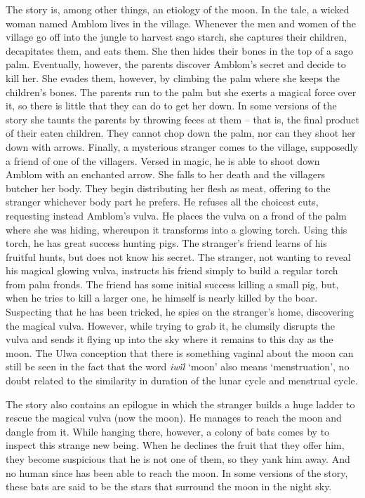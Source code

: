   The story is, among other things, an etiology of the moon. In the tale, a wicked woman named Amblom lives in the village. Whenever the men and women of the village go off into the jungle to harvest sago starch, she captures their children, decapitates them, and eats them. She then hides their bones in the top of a sago palm. Eventually, however, the parents discover Amblom’s secret and decide to kill her. She evades them, however, by climbing the palm where she keeps the children’s bones. The parents run to the palm but she exerts a magical force over it, so there is little that they can do to get her down. In some versions of the story she taunts the parents by throwing feces at them -- that is, the final product of their eaten children. They cannot chop down the palm, nor can they shoot her down with arrows. Finally, a mysterious stranger comes to the village, supposedly a friend of one of the villagers. Versed in magic, he is able to shoot down Amblom with an enchanted arrow. She falls to her death and the villagers butcher her body. They begin distributing her flesh as meat, offering to the stranger whichever body part he prefers. He refuses all the choicest cuts, requesting instead Amblom’s vulva. He places the vulva on a frond of the palm where she was hiding, whereupon it transforms into a glowing torch. Using this torch, he has great success hunting pigs. The stranger’s friend learns of his fruitful hunts, but does not know his secret. The stranger, not wanting to reveal his magical glowing vulva, instructs his friend simply to build a regular torch from palm fronds. The friend has some initial success killing a small pig, but, when he tries to kill a larger one, he himself is nearly killed by the boar. Suspecting that he has been tricked, he spies on the stranger’s home, discovering the magical vulva. However, while trying to grab it, he clumsily disrupts the vulva and sends it flying up into the sky where it remains to this day as the moon. The Ulwa conception that there is something vaginal about the moon can still be seen in the fact that the word \textit{iwïl} ‘moon’ also means ‘menstruation’, no doubt related to the similarity in duration of the lunar cycle and menstrual cycle.

  The story also contains an epilogue in which the stranger builds a huge ladder to rescue the magical vulva (now the moon). He manages to reach the moon and dangle from it. While hanging there, however, a colony of bats comes by to inspect this strange new being. When he declines the fruit that they offer him, they become suspicious that he is not one of them, so they yank him away. And no human since has been able to reach the moon. In some versions of the story, these bats are said to be the stars that surround the moon in the night sky.

